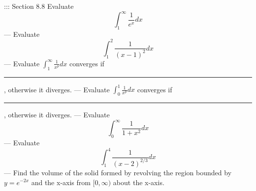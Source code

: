::: Section 8.8
Evaluate
\[\int_1^\infty\frac{1}{e^x}dx\]
---
Evaluate
\[\int_1^2\frac{1}{(x-1)^2}dx\]
---
Evaluate
\(\int_1^\infty\frac{1}{x^p}dx\) converges if \rule{1cm}{0.15mm}, otherwise it diverges.
---
Evaluate
\(\int_0^1\frac{1}{x^p}dx\) converges if \rule{1cm}{0.15mm}, otherwise it diverges.
---
Evaluate
\[\int_0^\infty\frac{1}{1+x^2}dx\]
---
Evaluate
\[\int_1^4\frac{1}{(x-2)^{2/3}}dx\]
---
Find the volume of the solid formed by revolving the region bounded by \(y=e^{-2x}\) and the x-axis from \([0,\infty)\) about the x-axis.
